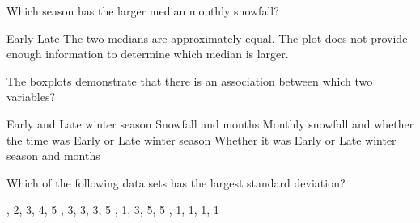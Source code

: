 \documentclass{article}
\begin{document}
\begin{mcquestions}
		\question[follow] Which season has the larger median monthly snowfall?
		\begin{mcanswerslist}
			\answer Early
			\answer[correct] Late
			\answer The two medians are approximately equal.
			\answer The plot does not provide enough information to determine which median is larger.
		\end{mcanswerslist}
		
		\question[follow] The boxplots demonstrate that there is an association between which two variables?
		\begin{mcanswerslist}
			\answer Early and Late winter season
			\answer Snowfall and months
			\answer[correct] Monthly snowfall and whether the time was Early or Late winter season
			\answer Whether it was Early or Late winter season and months
		\end{mcanswerslist}
		
		\question Which of the following data sets has the largest standard deviation?
		\begin{mcanswerslist}
			, 2, 3, 4, 5
			, 3, 3, 3, 5
			, 1, 3, 5, 5
			, 1, 1, 1, 1
		\end{mcanswerslist}
		
	\end{mcquestions}
\end{document}
